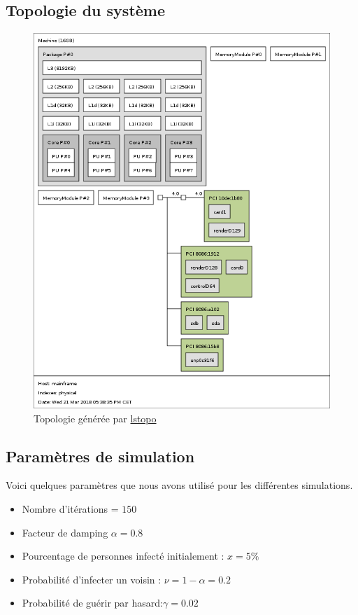 \documentclass{report}
\begin{document}
  \subsection{Topologie du système}
    \begin{figure}[ht!]
      \centering
      \includegraphics[scale=0.35]{resources/lstopo.png}
      \caption{Topologie générée par \href{https://manpages.debian.org/jessie/hwloc/lstopo.1.en.html}{lstopo}}
    \end{figure}
\newpage
\subsection{Paramètres de simulation}
Voici quelques paramètres que nous avons utilisé pour les différentes simulations.
\begin{itemize}[label=$\bullet$]
  \item Nombre d’itérations  = $150$
  \item Facteur de damping $\alpha = 0.8$
  \item Pourcentage de personnes infecté initialement : $x=5\%$
  \item Probabilité d’infecter un voisin : $\nu = 1 - \alpha = 0.2$
  \item Probabilité de guérir par hasard:$\gamma = 0.02$
\end{itemize}
\newpage
\end{document}
